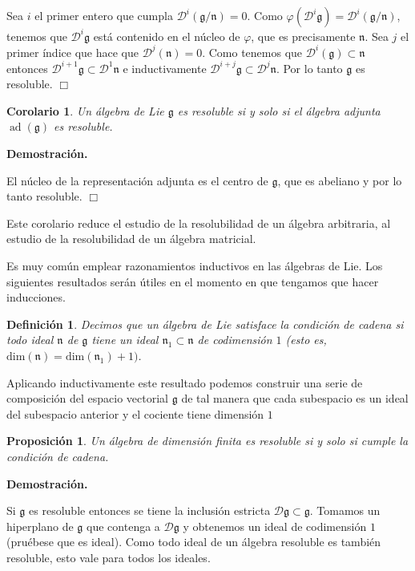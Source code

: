 \documentclass[a4paper,draft,12pt]{article}
\newtheorem{defi}{Definición}[section]%
\newtheorem{propo}[teo]{Proposición}%
\newtheorem{cor}[teo]{Corolario}%
\newcommand{\dem}{\noindent \textbf{Demostración. }\vspace{0.3 cm}}%
\newcommand{\g}{\mathfrak{g}}%
\newcommand{\fin}{ $\Box $ \vspace{0.4 cm}}
\newcommand{\D}{\mathcal{D}}%
\newcommand{\df}[1]{\textsf{\color{blue}#1}}
\DeclareMathOperator{\ad}{ad}  %
\begin{document}
Sea $i$ el primer entero que cumpla $\D^i(\g/\mathfrak{n})=0$.  Como $\varphi(\D^i\g)= \D^i(\g/\mathfrak{n})$, tenemos que $\D^i\g$ está contenido en el núcleo de $\varphi$, que es precisamente $\mathfrak{n}$.  Sea $j$ el primer índice que hace que $\D^j(\mathfrak{n})=0$.  Como tenemos que $\D^i(\g) \subset \mathfrak{n}$ entonces $\D^{i+1}\g \subset \D^1\mathfrak{n}$ e inductivamente $\D^{i+j}\g \subset \D^j\mathfrak{n}$.  Por lo tanto $\g$ es resoluble.  \fin

\begin{cor}

Un álgebra de Lie $\g$ es resoluble si y solo si el álgebra adjunta $\ad(\g)$ es resoluble.

\end{cor}

\dem

El núcleo de la representación adjunta es el centro de $\g$, que es abeliano y por lo tanto resoluble.  \fin

Este corolario reduce el estudio de la resolubilidad de un álgebra arbitraria, al estudio de la resolubilidad de un álgebra matricial. 



Es muy común emplear razonamientos inductivos en las álgebras de Lie. Los siguientes resultados serán útiles en el momento en que tengamos que hacer inducciones.




\begin{defi}

Decimos que un álgebra de Lie satisface la  \df{condición de cadena}  si todo ideal $\mathfrak{n}$ de $\g$ tiene un ideal $\mathfrak{n}_1 \subset \mathfrak{n}$ de codimensión $1$ (esto es, $\mathrm{dim}(\mathfrak{n}) = \mathrm{dim}(\mathfrak{n}_1)+1)$.

\end{defi}

Aplicando inductivamente este resultado podemos construir una serie de composición del espacio vectorial $\g$ de tal manera que cada subespacio es un ideal del subespacio anterior y el cociente tiene dimensión $1$
\begin{propo}

Un álgebra de dimensión finita es resoluble si y solo si cumple la condición de cadena.

\end{propo}

\dem

Si $\g$ es resoluble entonces se tiene la inclusión estricta $\D\g \subset \g$.  Tomamos un hiperplano de $\g$ que contenga a $\D\g$ y obtenemos un ideal de codimensión $1$ (pruébese que es ideal).  Como todo ideal de un álgebra resoluble es también resoluble, esto vale para todos los ideales.
\end{document}
